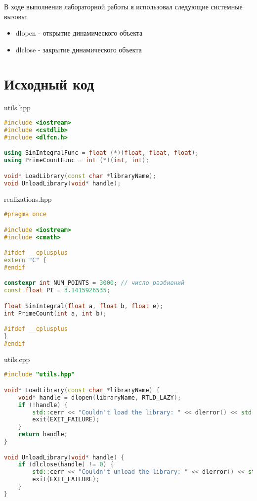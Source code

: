 \documentclass[a4paper, 12pt]{article}
\begin{document}
В ходе выполнения лабораторной работы я использовал следующие системные вызовы:
\begin{itemize}
  \item dlopen - открытие динамического объекта
  \item dlclose - закрытие динамического объекта
\end{itemize}


\newpage

\section{Исходный код}
utils.hpp
\begin{lstlisting}[language=C++]
#include <iostream>
#include <cstdlib>
#include <dlfcn.h>

using SinIntegralFunc = float (*)(float, float, float);
using PrimeCountFunc = int (*)(int, int);

void* LoadLibrary(const char *libraryName);
void UnloadLibrary(void* handle);
\end{lstlisting}

realizations.hpp
\begin{lstlisting}[language=C++]
#pragma once

#include <iostream>
#include <cmath>

#ifdef __cplusplus
extern "C" {
#endif

constexpr int NUM_POINTS = 3000; // число разбиений
const float PI = 3.1415926535;

float SinIntegral(float a, float b, float e);
int PrimeCount(int a, int b);

#ifdef __cplusplus
}
#endif
\end{lstlisting}

utils.cpp
\begin{lstlisting}[language=C++]
#include "utils.hpp"

void* LoadLibrary(const char *libraryName) {
    void* handle = dlopen(libraryName, RTLD_LAZY);
    if (!handle) {
        std::cerr << "Couldn't load the library: " << dlerror() << std::endl;
        exit(EXIT_FAILURE);
    }
    return handle;
}

void UnloadLibrary(void* handle) {
    if (dlclose(handle) != 0) {
        std::cerr << "Couldn't unload the library: " << dlerror() << std::endl;
        exit(EXIT_FAILURE);
    }
}
\end{lstlisting}
\end{document}
